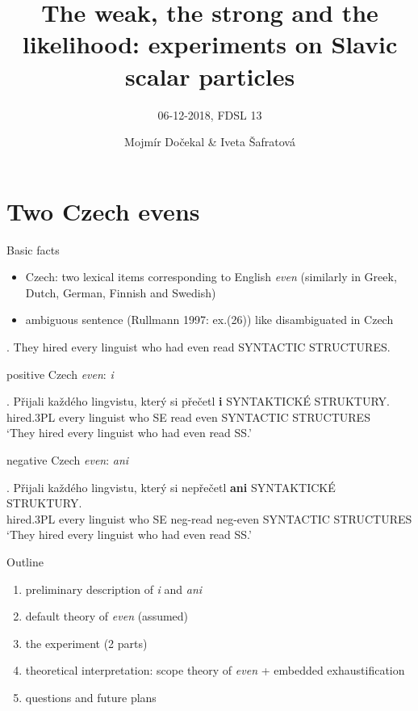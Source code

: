 \documentclass[ignorenonframetext,]{beamer}
\title{The	weak,	the	strong	and	the	
likelihood:	experiments	on	Slavic	
scalar	particles}
\subtitle{06-12-2018, FDSL 13}
\author{Mojmír Dočekal \& Iveta Šafratová}
\date{}
\providecommand{\tightlist}{%
  \setlength{\itemsep}{0pt}\setlength{\parskip}{0pt}}
\begin{document}
\frame{\titlepage}

\section{Two Czech evens}\label{two-czech-evens}

\begin{frame}{Basic facts}

\begin{itemize}
\tightlist
\item Czech: two lexical items corresponding to English \emph{even}
  (similarly in Greek, Dutch, German, Finnish and Swedish)
\item
  ambiguous sentence (Rullmann 1997: ex.(26)) like \Next disambiguated
  in Czech
\end{itemize}

\ex. They hired every linguist who had even read SYNTACTIC STRUCTURES.

\end{frame}

\begin{frame}

positive Czech \emph{even}: \emph{i}

\exg. Přijali každého lingvistu, který si přečetl \textbf{i} SYNTAKTICKÉ
STRUKTURY.\\
hired.3PL every linguist who SE read even SYNTACTIC STRUCTURES\\
`They hired every linguist who had even read SS.'

negative Czech \emph{even}: \emph{ani}

\exg. Přijali každého lingvistu, který si nepřečetl \textbf{ani}
SYNTAKTICKÉ STRUKTURY.\\
hired.3PL every linguist who SE neg-read neg-even SYNTACTIC STRUCTURES\\
`They hired every linguist who had even read SS.'

\end{frame}


\begin{frame}{Outline}

\begin{enumerate}
\def\labelenumi{\arabic{enumi})}
\tightlist
\item
  preliminary description of \emph{i} and \emph{ani}
\item
  default theory of \emph{even} (assumed)
\item
  the experiment (2 parts)
\item
  theoretical interpretation: scope theory of \emph{even} + embedded
  exhaustification
\item
  questions and future plans
\end{enumerate}

\end{frame}
\end{document}
